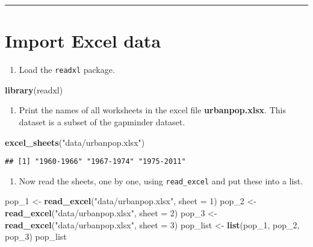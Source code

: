 \documentclass[]{article}
\newenvironment{Shaded}{\begin{snugshade}}{\end{snugshade}}
\newcommand{\KeywordTok}[1]{\textcolor[rgb]{0.13,0.29,0.53}{\textbf{#1}}}
\newcommand{\DataTypeTok}[1]{\textcolor[rgb]{0.13,0.29,0.53}{#1}}
\newcommand{\DecValTok}[1]{\textcolor[rgb]{0.00,0.00,0.81}{#1}}
\newcommand{\StringTok}[1]{\textcolor[rgb]{0.31,0.60,0.02}{#1}}
\newcommand{\NormalTok}[1]{#1}
\providecommand{\tightlist}{%
  \setlength{\itemsep}{0pt}\setlength{\parskip}{0pt}}
\begin{document}
\begin{center}\rule{0.5\linewidth}{\linethickness}\end{center}

\section{Import Excel data}\label{import-excel-data}

\begin{enumerate}
\def\labelenumi{\arabic{enumi}.}
\tightlist
\item
  Load the \texttt{readxl} package.
\end{enumerate}

\begin{Shaded}
\begin{Highlighting}[]
\KeywordTok{library}\NormalTok{(readxl)}
\end{Highlighting}
\end{Shaded}

\begin{enumerate}
\def\labelenumi{\arabic{enumi}.}
\setcounter{enumi}{1}
\tightlist
\item
  Print the names of all worksheets in the excel file
  \textbf{urbanpop.xlsx}. This dataset is a subset of the gapminder
  dataset.
\end{enumerate}

\begin{Shaded}
\begin{Highlighting}[]
\KeywordTok{excel_sheets}\NormalTok{(}\StringTok{"data/urbanpop.xlsx"}\NormalTok{)}
\end{Highlighting}
\end{Shaded}

\begin{verbatim}
## [1] "1960-1966" "1967-1974" "1975-2011"
\end{verbatim}

\begin{enumerate}
\def\labelenumi{\arabic{enumi}.}
\setcounter{enumi}{2}
\tightlist
\item
  Now read the sheets, one by one, using \texttt{read\_excel} and put
  these into a list.
\end{enumerate}

\begin{Shaded}
\begin{Highlighting}[]
\NormalTok{pop_}\DecValTok{1}\NormalTok{ <-}\StringTok{ }\KeywordTok{read_excel}\NormalTok{(}\StringTok{"data/urbanpop.xlsx"}\NormalTok{, }\DataTypeTok{sheet =} \DecValTok{1}\NormalTok{)}
\NormalTok{pop_}\DecValTok{2}\NormalTok{ <-}\StringTok{ }\KeywordTok{read_excel}\NormalTok{(}\StringTok{"data/urbanpop.xlsx"}\NormalTok{, }\DataTypeTok{sheet =} \DecValTok{2}\NormalTok{)}
\NormalTok{pop_}\DecValTok{3}\NormalTok{ <-}\StringTok{ }\KeywordTok{read_excel}\NormalTok{(}\StringTok{"data/urbanpop.xlsx"}\NormalTok{, }\DataTypeTok{sheet =} \DecValTok{3}\NormalTok{)}
\NormalTok{pop_list <-}\StringTok{ }\KeywordTok{list}\NormalTok{(pop_}\DecValTok{1}\NormalTok{, pop_}\DecValTok{2}\NormalTok{, pop_}\DecValTok{3}\NormalTok{)}
\NormalTok{pop_list}
\end{Highlighting}
\end{Shaded}
\end{document}
